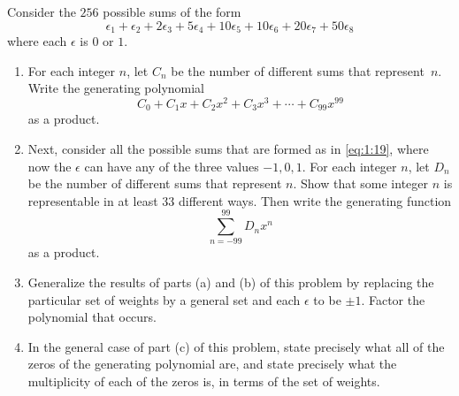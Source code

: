 \begin{exercise}
    Consider the $256$ possible sums of the form
    \begin{equation} \label{eq:1:19}
        \epsilon_1 + \epsilon_2 + 2 \epsilon_3 + 5 \epsilon_4 + 10 \epsilon_5 + 10 \epsilon_6 + 20\epsilon_7 + 50 \epsilon_8
    \end{equation}
    where each $\epsilon$ is $0$ or $1$.
    \begin{enumerate}[label=(\alph*)]
        \item For each integer $n$, let $C_n$ be the number of different sums that represent~$n$. Write the generating polynomial
        \[C_0 + C_1x + C_2x^2 + C_3x^3 + \cdots + C_{99}x^{99}\]
        as a product.
        \item Next, consider all the possible sums that are formed as in \eqref{eq:1:19}, where now the $\epsilon$ can have any of the three values $-1,0,1$. For each integer $n$, let $D_n$ be the number of different sums that represent $n$. Show that some integer $n$ is representable in at least $33$ different ways. Then write the generating function
        \[
            \sum_{n=-99}^{99} D_nx^n
        \]
        as a product.
        \item Generalize the results of parts (a) and (b) of this problem by replacing the particular set of weights by a general set and each $\epsilon$ to be $\pm 1$. Factor the polynomial that occurs.
        \item In the general case of part (c) of this problem, state precisely what all of the zeros of the generating polynomial are, and state precisely what the multiplicity of each of the zeros is, in terms of the set of weights.
    \end{enumerate}
\end{exercise}

